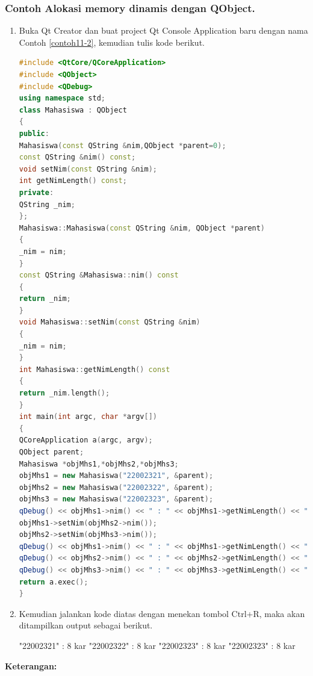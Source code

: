 \subsubsection*{Contoh  Alokasi memory dinamis dengan QObject.}

\begin{enumerate}

\item
  Buka Qt Creator dan buat project Qt Console Application baru dengan
  nama Contoh \ref{contoh11-2}, kemudian tulis kode berikut.

\begin{lstlisting}[language=c++, caption=Alokasi memory dinamis dengan QObject, label=contoh11-2]
#include <QtCore/QCoreApplication>
#include <QObject>
#include <QDebug>
using namespace std;
class Mahasiswa : QObject
{
public:
Mahasiswa(const QString &nim,QObject *parent=0);
const QString &nim() const;
void setNim(const QString &nim);
int getNimLength() const;
private:
QString _nim;
};
Mahasiswa::Mahasiswa(const QString &nim, QObject *parent)
{
_nim = nim;
}
const QString &Mahasiswa::nim() const
{
return _nim;
}
void Mahasiswa::setNim(const QString &nim)
{
_nim = nim;
}
int Mahasiswa::getNimLength() const
{
return _nim.length();
}
int main(int argc, char *argv[])
{
QCoreApplication a(argc, argv);
QObject parent;
Mahasiswa *objMhs1,*objMhs2,*objMhs3;
objMhs1 = new Mahasiswa("22002321", &parent);
objMhs2 = new Mahasiswa("22002322", &parent);
objMhs3 = new Mahasiswa("22002323", &parent);
qDebug() << objMhs1->nim() << " : " << objMhs1->getNimLength() << " kar";
objMhs1->setNim(objMhs2->nim());
objMhs2->setNim(objMhs3->nim());
qDebug() << objMhs1->nim() << " : " << objMhs1->getNimLength() << " kar";
qDebug() << objMhs2->nim() << " : " << objMhs2->getNimLength() << " kar";
qDebug() << objMhs3->nim() << " : " << objMhs3->getNimLength() << " kar";
return a.exec();
}
\end{lstlisting}
\item
  Kemudian jalankan kode diatas dengan menekan tombol Ctrl+R, maka akan
  ditampilkan output sebagai berikut.

\begin{lcverbatim}
"22002321"  :  8  kar
"22002322"  :  8  kar
"22002323"  :  8  kar
"22002323"  :  8  kar
\end{lcverbatim}
\end{enumerate}

\textbf{Keterangan:}

